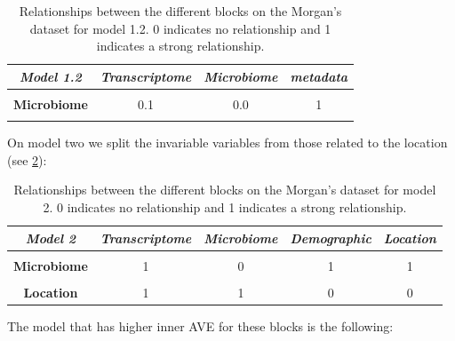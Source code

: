 \documentclass[
  12pt,
  a4paper,
  twoside,
  openright]{book}
\begin{document}
\begin{table}[H]

\caption[Model 1.2 of the Morgan's dataset.]{\label{tab:morgan-model1-2}Relationships between the different blocks on the Morgan's dataset for model 1.2. 0 indicates no relationship and 1 indicates a strong relationship.}
\centering
\begin{tabular}[t]{|>{}c|c|c|>{}c|}
\hline
\em{\textbf{Model 1.2}} & \em{\textbf{Transcriptome}} & \em{\textbf{Microbiome}} & \em{\textbf{metadata}}\\
\hline
\textbf{\cellcolor{gray!6}{Transcriptome}} & \cellcolor{gray!6}{0.0} & \cellcolor{gray!6}{0.1} & \cellcolor{gray!6}{0}\\
\hline
\textbf{Microbiome} & 0.1 & 0.0 & 1\\
\hline
\textbf{\cellcolor{gray!6}{metadata}} & \cellcolor{gray!6}{0.0} & \cellcolor{gray!6}{1.0} & \cellcolor{gray!6}{0}\\
\hline
\end{tabular}
\end{table}

On model two we split the invariable variables from those related to the location (see \ref{tab:morgan-model2}):

\begin{table}[H]

\caption[Model 2 of the Morgan's dataset.]{\label{tab:morgan-model2}Relationships between the different blocks on the Morgan's dataset for model 2. 0 indicates no relationship and 1 indicates a strong relationship.}
\centering
\begin{tabular}[t]{|>{}c|c|c|c|>{}c|}
\hline
\em{\textbf{Model 2}} & \em{\textbf{Transcriptome}} & \em{\textbf{Microbiome}} & \em{\textbf{Demographic}} & \em{\textbf{Location}}\\
\hline
\textbf{\cellcolor{gray!6}{Transcriptome}} & \cellcolor{gray!6}{0} & \cellcolor{gray!6}{1} & \cellcolor{gray!6}{1} & \cellcolor{gray!6}{1}\\
\hline
\textbf{Microbiome} & 1 & 0 & 1 & 1\\
\hline
\textbf{\cellcolor{gray!6}{Demographic}} & \cellcolor{gray!6}{1} & \cellcolor{gray!6}{1} & \cellcolor{gray!6}{0} & \cellcolor{gray!6}{0}\\
\hline
\textbf{Location} & 1 & 1 & 0 & 0\\
\hline
\end{tabular}
\end{table}

The model that has higher inner AVE for these blocks is the following:
\end{document}
